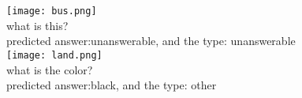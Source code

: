 \documentclass{report}
\begin{document}
\texttt{[image: bus.png]}\\
    
what is this?\\
predicted answer:unanswerable, and the type: unanswerable\\


\texttt{[image: land.png]}\\
what is the color?\\
predicted answer:black, and the type: other
\end{document}
